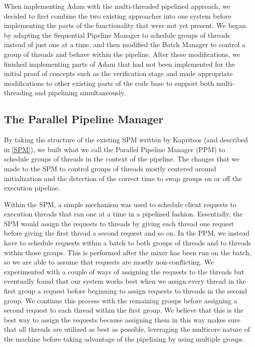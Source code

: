 \documentclass[11pt, oneside]{report}
\begin{document}
When implementing Adam with the multi-threaded pipelined approach, we decided to first combine the two existing approaches into one system before implementing the parts of the functionality that were not yet present. 
We began by adapting the Sequential Pipeline Manager to schedule groups of threads instead of just one at a time, and then modified the Batch Manager to control a group of threads and behave within the pipeline.
After these modifications, we finished implementing parts of Adam that had not been implemented for the initial proof of concepts such as the verification stage and made appropriate modifications to other existing parts of the code base to support both multi-threading and pipelining simultaneously.

\subsection{The Parallel Pipeline Manager}

By taking the structure of the existing SPM written by Kapritsos (and described in \ref{SPM}), we built what we call the Parallel Pipeline Manager (PPM) to schedule groups of threads in the context of the pipeline. 
The changes that we made to the SPM to control groups of threads mostly centered around initialization and the detection of the correct time to swap groups on or off the execution pipeline.

Within the SPM, a simple mechanism was used to schedule client requests to execution threads that ran one at a time in a pipelined fashion. 
Essentially, the SPM would assign the requests to threads by giving each thread one request before giving the first thread a second request and so on. 
In the PPM, we instead have to schedule requests within a batch to both groups of threads and to threads within those groups. 
This is performed after the mixer has been run on the batch, so we are able to assume that requests are mostly non-conflicting. 
We experimented with a couple of ways of assigning the requests to the threads but eventually found that our system works best when we assign every thread in the first group a request before beginning to assign requests to threads in the second group.
We continue this process with the remaining groups before assigning a second request to each thread within the first group. 
We believe that this is the best way to assign the requests because assigning them in this way makes sure that all threads are utilized as best as possible, leveraging the multicore nature of the machine before taking advantage of the pipelining by using multiple groups.
\end{document}
